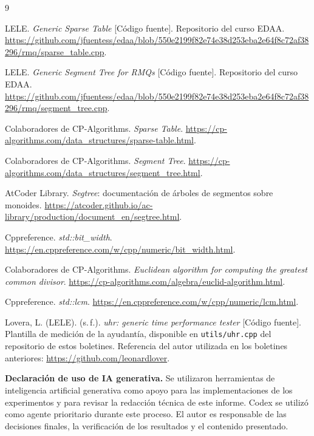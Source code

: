 \begin{thebibliography}{9}
\raggedright
{}
{}

LELE. \textit{Generic Sparse Table} [Código fuente].
Repositorio del curso EDAA.
\url{https://github.com/jfuentess/edaa/blob/550e2199f82e74e38d253eba2e64f8c72af38296/rmq/sparse_table.cpp}.

LELE. \textit{Generic Segment Tree for RMQs} [Código fuente].
Repositorio del curso EDAA.
\url{https://github.com/jfuentess/edaa/blob/550e2199f82e74e38d253eba2e64f8c72af38296/rmq/segment_tree.cpp}.

Colaboradores de CP-Algorithms.
\textit{Sparse Table}.
\url{https://cp-algorithms.com/data_structures/sparse-table.html}.

Colaboradores de CP-Algorithms.
\textit{Segment Tree}.
\url{https://cp-algorithms.com/data_structures/segment_tree.html}.

AtCoder Library.
\textit{Segtree}: documentación de árboles de segmentos sobre monoides.
\url{https://atcoder.github.io/ac-library/production/document_en/segtree.html}.

Cppreference.
\textit{std::bit\_width}.
\url{https://en.cppreference.com/w/cpp/numeric/bit_width.html}.

Colaboradores de CP-Algorithms.
\textit{Euclidean algorithm for computing the greatest common divisor}.
\url{https://cp-algorithms.com/algebra/euclid-algorithm.html}.

Cppreference.
\textit{std::lcm}.
\url{https://en.cppreference.com/w/cpp/numeric/lcm.html}.

Lovera, L. (LELE). (s.\,f.).
\textit{uhr: generic time performance tester} [Código fuente].
Plantilla de medición de la ayudantía, disponible en
\texttt{utils/uhr.cpp} del repositorio de estos boletines.
Referencia del autor utilizada en los boletines anteriores:
\url{https://github.com/leonardlover}.

\par\medskip
\noindent\textbf{Declaración de uso de IA generativa.}
Se utilizaron herramientas de inteligencia artificial generativa como apoyo para las implementaciones de los experimentos y para revisar la redacción técnica de este informe. Codex se utilizó como agente prioritario durante este proceso. El autor es responsable de las decisiones finales, la verificación de los resultados y el contenido presentado.

\end{thebibliography}
